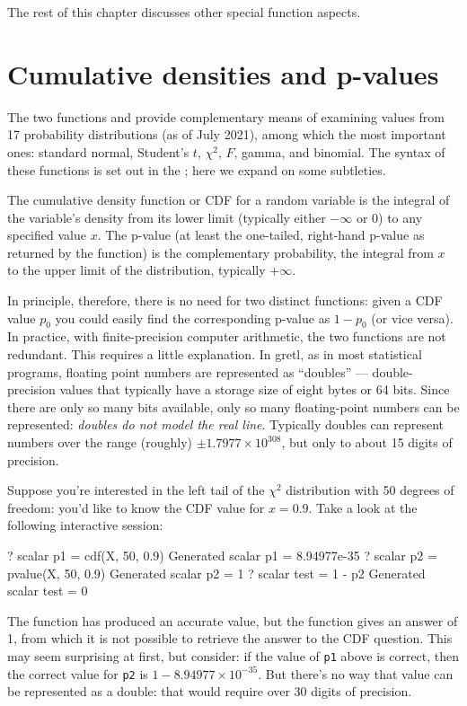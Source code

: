 The rest of this chapter discusses other special function aspects.

\section{Cumulative densities and p-values}
\label{sec:genr-cdf}

The two functions  and  provide complementary
means of examining values from 17 probability distributions (as of 
July 2021), among which the most important ones:
standard normal, Student's $t$, $\chi^2$, $F$, gamma, and binomial.
The syntax of these functions is set out in the \GCR; here we expand
on some subtleties.

The cumulative density function or CDF for a random variable
is the integral of the variable's density from its lower limit
(typically either $-\infty$ or 0) to any specified value $x$.  The
p-value (at least the one-tailed, right-hand p-value as returned by
the  function) is the complementary probability, the
integral from $x$ to the upper limit of the distribution, typically
$+\infty$.

In principle, therefore, there is no need for two distinct functions:
given a CDF value $p_0$ you could easily find the corresponding
p-value as $1-p_0$ (or vice versa).  In practice, with
finite-precision computer arithmetic, the two functions are not
redundant.  This requires a little explanation.  In gretl, as in
most statistical programs, floating point numbers are represented as
``doubles'' --- double-precision values that typically have a storage
size of eight bytes or 64 bits.  Since there are only so many bits
available, only so many floating-point numbers can be represented:
\textit{doubles do not model the real line}.  Typically doubles can
represent numbers over the range (roughly) $\pm 1.7977 \times
10^{308}$, but only to about 15 digits of precision.

Suppose you're interested in the left tail of the $\chi^2$ distribution
with 50 degrees of freedom: you'd like to know the CDF value for $x =
0.9$.  Take a look at the following interactive session:
\begin{code}
? scalar p1 = cdf(X, 50, 0.9)
Generated scalar p1 = 8.94977e-35
? scalar p2 = pvalue(X, 50, 0.9)
Generated scalar p2 = 1
? scalar test = 1 - p2
Generated scalar test = 0
\end{code}

The  function has produced an accurate value, but the
 function gives an answer of 1, from which it is not
possible to retrieve the answer to the CDF question.  This may seem
surprising at first, but consider: if the value of \texttt{p1} above
is correct, then the correct value for \texttt{p2} is $1 - 8.94977
\times 10^{-35}$.  But there's no way that value can be represented as
a double: that would require over 30 digits of precision.

